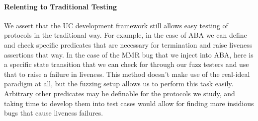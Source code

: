 \paragraph{Relenting to Traditional Testing}
We assert that the UC development framework still allows easy testing of protocols in the traditional way.
For example, in the case of ABA we can define and check specific predicates that are necessary for termination and raise liveness assertions that way. 
In the case of the MMR bug that we inject into ABA, here is a specific state transition that we can check for through our fuzz testers and use that to raise a failure in liveness.
This method doesn't make use of the real-ideal paradigm at all, but the fuzzing setup allows us to perform this task easily. 
Arbitrary other predicates may be definable for the protocols we study, and taking time to develop them into test cases would allow for finding more insidious bugs that cause liveness failures.


%

